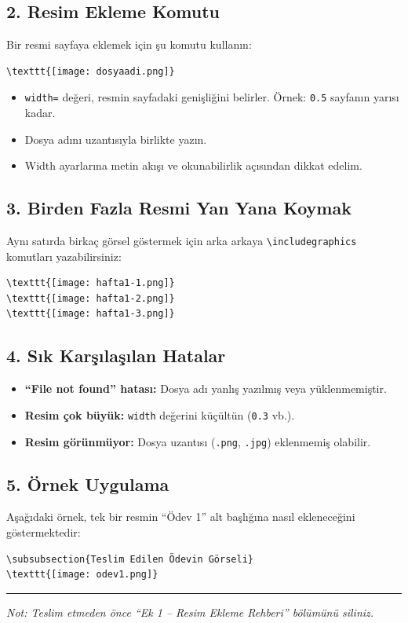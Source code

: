 \documentclass[a4paper,12pt]{article}
\begin{document}
\subsection*{2. Resim Ekleme Komutu}
Bir resmi sayfaya eklemek için şu komutu kullanın:
\begin{verbatim}
\texttt{[image: dosyaadi.png]}
\end{verbatim}

\begin{itemize}
    \item \texttt{width=} değeri, resmin sayfadaki genişliğini belirler. 
      Örnek: \texttt{0.5\textwidth}  sayfanın yarısı kadar.
    \item Dosya adını uzantısıyla birlikte yazın.
    \item Width ayarlarına metin akışı ve  okunabilirlik açısından dikkat edelim.
\end{itemize}

\subsection*{3. Birden Fazla Resmi Yan Yana Koymak}
Aynı satırda birkaç görsel göstermek için arka arkaya \texttt{\textbackslash includegraphics} komutları yazabilirsiniz:
\begin{verbatim}
\texttt{[image: hafta1-1.png]}
\texttt{[image: hafta1-2.png]}
\texttt{[image: hafta1-3.png]}
\end{verbatim}

\subsection*{4. Sık Karşılaşılan Hatalar}
\begin{itemize}
    \item \textbf{“File not found” hatası:} Dosya adı yanlış yazılmış veya yüklenmemiştir.
    \item \textbf{Resim çok büyük:} \texttt{width} değerini küçültün (\texttt{0.3\textwidth} vb.).
    \item \textbf{Resim görünmüyor:} Dosya uzantısı (\texttt{.png}, \texttt{.jpg}) eklenmemiş olabilir.
\end{itemize}

\subsection*{5. Örnek Uygulama}
Aşağıdaki örnek, tek bir resmin “Ödev 1” alt başlığına nasıl ekleneceğini göstermektedir:
\begin{verbatim}
\subsubsection{Teslim Edilen Ödevin Görseli}
\texttt{[image: odev1.png]}
\end{verbatim}

\vspace{1cm}
\noindent\rule{\textwidth}{0.4pt}
\textit{Not:
Teslim etmeden önce “Ek 1 – Resim Ekleme Rehberi” bölümünü siliniz.}
\end{document}
